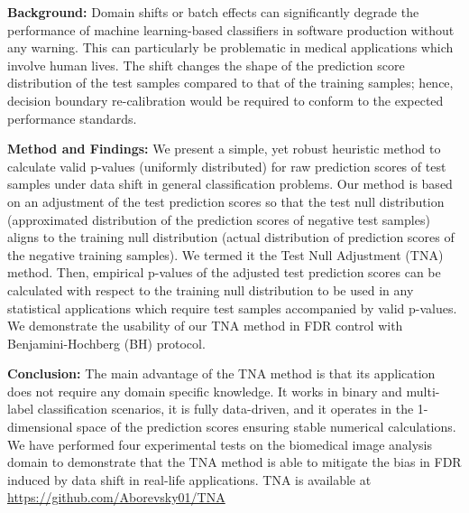 \documentclass[10pt,letterpaper]{article}
\begin{document}
\textbf{Background:} Domain shifts or batch effects can significantly degrade the performance of machine learning-based classifiers in software production without any warning.
This can particularly be problematic in medical applications which involve human lives.
The shift changes the shape of the prediction score distribution of the test samples compared to that of the training samples; hence, decision boundary re-calibration would be required to conform to the expected performance standards. 

\textbf{Method and Findings:} We present a simple, yet robust heuristic method to calculate valid p-values (uniformly distributed) for raw prediction scores of test samples under data shift in general classification problems.
Our method is based on an adjustment of the test prediction scores so that the test null distribution (approximated distribution of the prediction scores of negative test samples) aligns to the training null distribution (actual distribution of prediction scores of the negative training samples).
We termed it the Test Null Adjustment (TNA) method.
Then, empirical p-values of the adjusted test prediction scores can be calculated with respect to the training null distribution to be used in any statistical applications which require test samples accompanied by valid p-values.
We demonstrate the usability of our TNA method in FDR control with Benjamini-Hochberg (BH) protocol. 

\textbf{Conclusion:} The main advantage of the TNA method is that its application does not require any domain specific knowledge.
It works in binary and multi-label classification scenarios, it is fully data-driven, and it operates in the 1-dimensional space of the prediction scores ensuring stable numerical calculations.
We have performed four experimental tests on the biomedical image analysis domain to demonstrate that the TNA method is able to mitigate the bias in FDR induced by data shift in real-life applications. TNA is available at \url{https://github.com/Aborevsky01/TNA}



%
\end{document}
